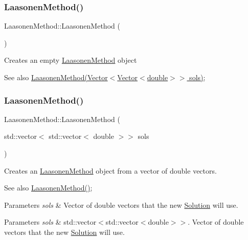 \subsubsection{\texorpdfstring{Laasonen\+Method()}{LaasonenMethod()}\hspace{0.1cm}{\footnotesize\ttfamily [1/2]}}
{\footnotesize\ttfamily Laasonen\+Method\+::\+Laasonen\+Method (\begin{DoxyParamCaption}{ }\end{DoxyParamCaption})}

Creates an empty \hyperlink{class_laasonen_method}{Laasonen\+Method} object \begin{DoxySeeAlso}{See also}
\hyperlink{class_laasonen_method}{Laasonen\+Method(\+Vector$<$\+Vector$<$double$>$$>$ sols)}; 
\end{DoxySeeAlso}
\mbox{\label{class_laasonen_method_a55dc0b88c2298a492d186564b9baed26}} 
\subsubsection{\texorpdfstring{Laasonen\+Method()}{LaasonenMethod()}\hspace{0.1cm}{\footnotesize\ttfamily [2/2]}}
{\footnotesize\ttfamily Laasonen\+Method\+::\+Laasonen\+Method (\begin{DoxyParamCaption}\item[{std\+::vector$<$ std\+::vector$<$ double $>$$>$}]{sols }\end{DoxyParamCaption})}

Creates an \hyperlink{class_laasonen_method}{Laasonen\+Method} object from a vector of double vectors. \begin{DoxySeeAlso}{See also}
\hyperlink{class_laasonen_method_a1bff2dc73fc66c3070fc7a187ff556f9}{Laasonen\+Method()}; 
\end{DoxySeeAlso}

\begin{DoxyParams}{Parameters}
{\em sols} & Vector of double vectors that the new \hyperlink{class_solution}{Solution} will use. \\
\hline
\end{DoxyParams}

\begin{DoxyParams}{Parameters}
{\em sols} & std\+::vector$<$std\+::vector$<$double$>$$>$. Vector of double vectors that the new \hyperlink{class_solution}{Solution} will use. \\
\hline
\end{DoxyParams}


